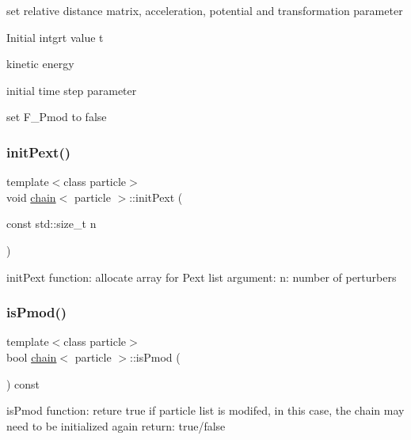 set relative distance matrix, acceleration, potential and transformation parameter

Initial intgrt value t

kinetic energy

initial time step parameter

set F\+\_\+\+Pmod to false \hypertarget{classchain_acc7edf934b406995525aea0533cd87d4}{}\label{classchain_acc7edf934b406995525aea0533cd87d4} 
\subsubsection{\texorpdfstring{init\+Pext()}{initPext()}}
{\footnotesize\ttfamily template$<$class particle$>$ \\
void \hyperlink{classchain}{chain}$<$ particle $>$\+::init\+Pext (\begin{DoxyParamCaption}\item[{const std\+::size\+\_\+t}]{n }\end{DoxyParamCaption})\hspace{0.3cm}{\ttfamily [inline]}}



init\+Pext function\+: allocate array for Pext list argument\+: n\+: number of perturbers 

\hypertarget{classchain_a45e5bde36e12c0388b175983c8f4b9cf}{}\label{classchain_a45e5bde36e12c0388b175983c8f4b9cf} 
\subsubsection{\texorpdfstring{is\+Pmod()}{isPmod()}}
{\footnotesize\ttfamily template$<$class particle$>$ \\
bool \hyperlink{classchain}{chain}$<$ particle $>$\+::is\+Pmod (\begin{DoxyParamCaption}{ }\end{DoxyParamCaption}) const\hspace{0.3cm}{\ttfamily [inline]}}



is\+Pmod function\+: reture true if particle list is modifed, in this case, the chain may need to be initialized again return\+: true/false 

\hypertarget{classchain_aa0716fdbd7717da18d32b0c5161f108f}{}\label{classchain_aa0716fdbd7717da18d32b0c5161f108f} 
